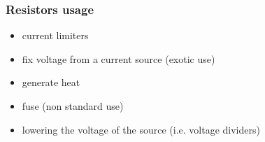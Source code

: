 \documentclass[beamer]{standalone}
\begin{document}
\begin{frame}
\begin{columns}[t]
\begin{column}{.3\textwidth}
\begin{figure}
   \end{figure}
  \end{column}
 \end{columns}
\end{frame}



\begin{frame}
 \frametitle{Resistors usage} 
 \begin{itemize}
  \item current limiters
  \item fix voltage from a current source (exotic use)
  \item generate heat 
  \item fuse (non standard use)
  \item lowering the voltage of the source (i.e. voltage dividers)
 \end{itemize}
\end{frame}
\end{document}
